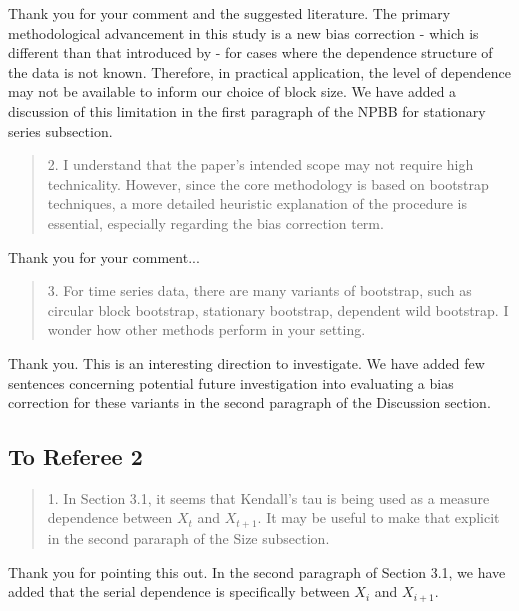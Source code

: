 \documentclass[12pt]{article}
\newenvironment{comment}%
{\begin{quotation}\noindent\small\it\color{darkblue}\ignorespaces%
}{\end{quotation}}
\begin{document}
Thank you for your comment and the suggested literature. The primary 
methodological 
advancement in this study is a new bias correction - which is different than 
that introduced by \citet{babu2004goodness} - for cases where the dependence
structure of the data is not known. Therefore, in practical application,
the level of dependence may not be available to inform our choice of block
size. We have added a discussion of this limitation in the first paragraph of 
the NPBB for stationary
series subsection.



\begin{comment}
2. I understand that the paper’s intended scope may not require high 
technicality. However,
since the core methodology is based on bootstrap techniques, a more detailed 
heuristic
explanation of the procedure is essential, especially regarding the bias 
correction term.
\end{comment}

Thank you for your comment...



\begin{comment}
3. For time series data, there are many variants of bootstrap, such as circular 
block bootstrap,
stationary bootstrap, dependent wild bootstrap. I wonder how other methods 
perform in
your setting.
\end{comment} 

Thank you. This is an interesting direction to investigate. We have added few
sentences concerning potential future investigation into evaluating a bias 
correction for these variants in the second paragraph of the Discussion 
section.



\subsection*{To Referee 2}

\begin{comment}
1. In Section 3.1, it seems that Kendall's tau is being used as a measure
dependence between $X_t$ and $X_{t+1}$. It may be useful to make that explicit 
in the
second pararaph of the Size subsection.
\end{comment}

Thank you for pointing this out. In the second paragraph of Section 3.1, 
we have added that the
serial dependence is specifically between $X_i$ and $X_{i+1}$.
\end{document}

